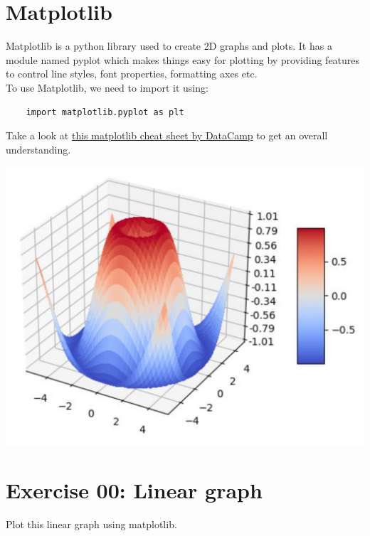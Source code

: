 \documentclass{42-en}
\begin{document}
\chapter{Matplotlib}

Matplotlib is a python library used to create 2D graphs and plots. It has a module named pyplot which makes things easy for plotting by providing features to control line styles, font properties, formatting axes etc.\\

To use Matplotlib, we need to import it using:\\

\begin{lstlisting}
    import matplotlib.pyplot as plt
\end{lstlisting}

Take a look at \href{https://s3.amazonaws.com/assets.datacamp.com/blog_assets/Python_Matplotlib_Cheat_Sheet.pdf}{this matplotlib cheat sheet by DataCamp} to get an overall understanding.

\centerline{\includegraphics[width=150mm]{images/3d_graph.png}}


\chapter{Exercise 00: Linear graph}
\makeheaderfiles

Plot this linear graph using matplotlib.\\
\end{document}
